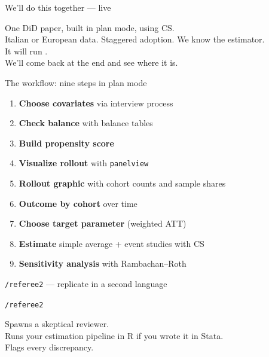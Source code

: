 \documentclass[aspectratio=169,11pt]{beamer}
\begin{document}
\begin{frame}{We'll do this together --- live}
\vspace{0.8em}
\begin{center}
\large
One DiD paper, built in plan mode, using CS.\\[0.6em]
\color{warmgray}\normalsize
Italian or European data. Staggered adoption. We know the estimator.\\[0.6em]
It will run .\\[0.4em]
We'll come back at the end and see where it is.
\end{center}
\end{frame}

\begin{frame}{The workflow: nine steps in plan mode}
\vspace{0.4em}
\begin{enumerate}\setlength\itemsep{0.35em}\small
  \item \textbf{Choose covariates} via interview process
  \item \textbf{Check balance} with balance tables
  \item \textbf{Build propensity score}
  \item \textbf{Visualize rollout} with \texttt{panelview}
  \item \textbf{Rollout graphic} with cohort counts and sample shares
  \item \textbf{Outcome by cohort} over time
  \item \textbf{Choose target parameter} (weighted ATT)
  \item \textbf{Estimate} simple average + event studies with CS
  \item \textbf{Sensitivity analysis} with Rambachan--Roth
\end{enumerate}
\end{frame}

\begin{frame}{\texttt{/referee2} --- replicate in a second language}
\vspace{1.0em}
\begin{center}
\large\texttt{/referee2}
\end{center}
\vspace{0.6em}
\begin{center}\normalsize\color{warmgray}
Spawns a skeptical reviewer.\\[0.4em]
Runs your estimation pipeline in R if you wrote it in Stata.\\[0.4em]
Flags every discrepancy.\\[0.6em]
\end{center}
\end{frame}
\end{document}
